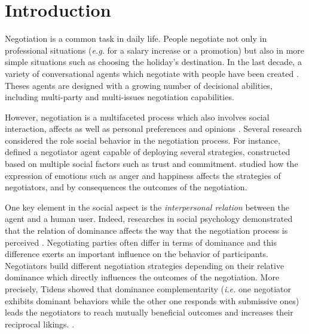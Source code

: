 \documentclass[sigconf]{aamas}  %
\begin{document}
	
	\maketitle

	
	\section{Introduction}
	
	Negotiation is a common task in daily life. People negotiate not only in professional situations (\emph{e.g.} for a salary increase or a promotion) but also in more simple situations such as choosing the holiday's destination. In the last decade, a variety of conversational agents which negotiate with people  have been created \cite{pynadath2013you,gratch2016misrepresentation,klatt2011negotiations}. Theses agents are designed with a growing number of decisional abilities, including multi-party and multi-issues negotiation capabilities.
	
	However, negotiation is a multifaceted process which also involves social interaction, affects as well as personal preferences and opinions  \cite{bro2010affective}. Several research considered the role social behavior in the negotiation process. For instance, \cite{traum2008multi} defined a negotiator agent capable of deploying several strategies, constructed based on multiple social factors such as trust and commitment. 
	\cite{de2011effect} studied how the expression of emotions such as anger and happiness affects the strategies of negotiators, and by consequences the outcomes of the negotiation. 
	
	One key element in the social aspect is the \emph{interpersonal relation} between the agent and a human user. 
	Indeed, researches in social psychology demonstrated that the relation of dominance affects the way that the negotiation process is perceived \cite{van2006power}. Negotiating parties often differ in terms of dominance and this difference exerts an important influence on the behavior of participants. Negotiators build different negotiation strategies depending on their relative dominance which directly influences the outcomes of the negotiation. 
	More precisely, Tidens \cite{tiedens2003power} showed that dominance complementarity (\emph{i.e.} one negotiator exhibits dominant behaviors while the other one responds with submissive ones) leads the negotiators to reach mutually beneficial outcomes and increases their reciprocal likings. \cite{wiltermuth2015benefits,tiedens2003power}.
	
\end{document}
